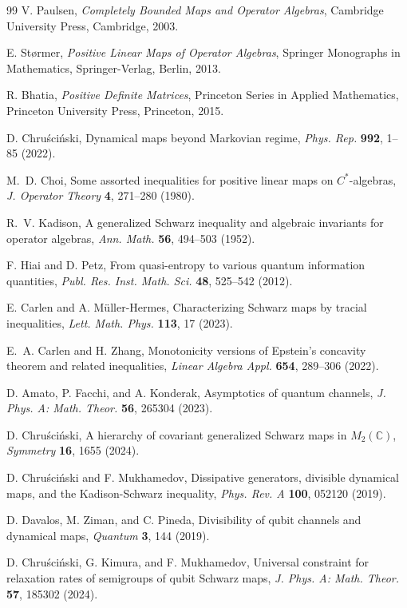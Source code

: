 \documentclass[11pt,reqno]{amsart}
\theoremstyle{definition}
\numberwithin{equation}{section} \setcounter{tocdepth}{1}
\numberwithin{equation}{section}
\begin{document}
\begin{thebibliography}{99}
V. Paulsen,
\emph{Completely Bounded Maps and Operator Algebras},
Cambridge University Press, Cambridge, 2003.

E. St{\o}rmer,
\emph{Positive Linear Maps of Operator Algebras},
Springer Monographs in Mathematics, Springer-Verlag, Berlin, 2013.

R. Bhatia,
\emph{Positive Definite Matrices},
Princeton Series in Applied Mathematics, Princeton University Press, Princeton, 2015.

D. Chru\'sci\'nski,
Dynamical maps beyond Markovian regime,
\emph{Phys. Rep.} \textbf{992}, 1–85 (2022).

M.~D. Choi,
Some assorted inequalities for positive linear maps on $C^*$-algebras,
\emph{J. Operator Theory} \textbf{4}, 271–280 (1980).

R.~V. Kadison,
A generalized Schwarz inequality and algebraic invariants for operator algebras,
\emph{Ann. Math.} \textbf{56}, 494–503 (1952).

F. Hiai and D. Petz,
From quasi-entropy to various quantum information quantities,
\emph{Publ. Res. Inst. Math. Sci.} \textbf{48}, 525–542 (2012).

E. Carlen and A. M\"uller-Hermes,
Characterizing Schwarz maps by tracial inequalities,
\emph{Lett. Math. Phys.} \textbf{113}, 17 (2023).

E.~A. Carlen and H. Zhang,
Monotonicity versions of Epstein's concavity theorem and related inequalities,
\emph{Linear Algebra Appl.} \textbf{654}, 289–306 (2022).

D. Amato, P. Facchi, and A. Konderak,
Asymptotics of quantum channels,
\emph{J. Phys. A: Math. Theor.} \textbf{56}, 265304 (2023).

D. Chru\'sci\'nski,
A hierarchy of covariant generalized Schwarz maps in $M_2(\mathbb{C})$,
\emph{Symmetry} \textbf{16}, 1655 (2024).

D. Chru\'sci\'nski and F. Mukhamedov,
Dissipative generators, divisible dynamical maps, and the Kadison-Schwarz inequality,
\emph{Phys. Rev. A} \textbf{100}, 052120 (2019).

D. Davalos, M. Ziman, and C. Pineda,
Divisibility of qubit channels and dynamical maps,
\emph{Quantum} \textbf{3}, 144 (2019).

D. Chru\'sci\'nski, G. Kimura, and F. Mukhamedov,
Universal constraint for relaxation rates of semigroups of qubit Schwarz maps,
\emph{J. Phys. A: Math. Theor.} \textbf{57}, 185302 (2024).


\end{thebibliography}
\end{document}
